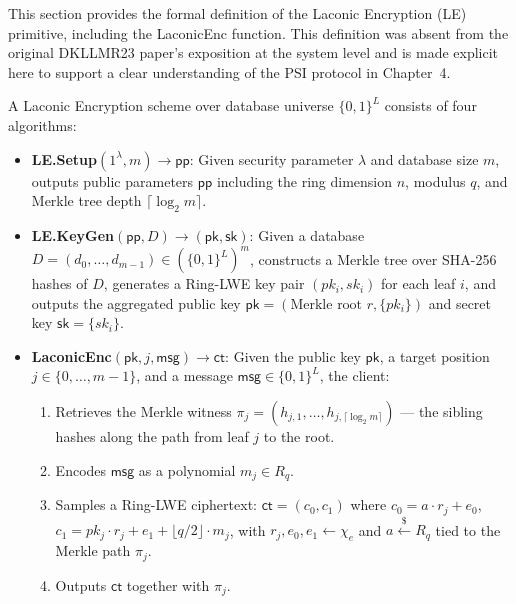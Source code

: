 This section provides the formal definition of the Laconic Encryption (LE) primitive,
including the \textsf{LaconicEnc} function. This definition was absent from the original
DKLLMR23 paper's exposition at the system level and is made explicit here to support
a clear understanding of the PSI protocol in Chapter~4.

\begin{definition}\label{def:laconic-enc}
A Laconic Encryption scheme over database universe $\{0,1\}^L$ consists of four algorithms:

\begin{itemize}
    \item \textsf{\textbf{LE.Setup}}$(1^\lambda, m) \to \mathsf{pp}$: Given security
          parameter $\lambda$ and database size $m$, outputs public parameters $\mathsf{pp}$
          including the ring dimension $n$, modulus $q$, and Merkle tree depth $\lceil \log_2 m \rceil$.
          
    \item \textsf{\textbf{LE.KeyGen}}$(\mathsf{pp}, D) \to (\mathsf{pk}, \mathsf{sk})$: Given a
          database $D = (d_0, \ldots, d_{m-1}) \in (\{0,1\}^L)^m$, constructs a Merkle tree
          over SHA-256 hashes of $D$, generates a Ring-LWE key pair $(pk_i, sk_i)$ for each
          leaf $i$, and outputs the aggregated public key $\mathsf{pk} = (\text{Merkle root } r, \{pk_i\})$
          and secret key $\mathsf{sk} = \{sk_i\}$.
          
    \item \textsf{\textbf{LaconicEnc}}$(\mathsf{pk}, j, \mathsf{msg}) \to \mathsf{ct}$: Given
          the public key $\mathsf{pk}$, a target position $j \in \{0, \ldots, m-1\}$, and a
          message $\mathsf{msg} \in \{0,1\}^L$, the client:
          \begin{enumerate}
              \item Retrieves the Merkle witness $\pi_j = (h_{j,1}, \dots, h_{j,\lceil \log_2 m \rceil})$ --- the sibling hashes along the path from leaf $j$ to the root.
              \item Encodes $\mathsf{msg}$ as a polynomial $m_j \in R_q$.
              \item Samples a Ring-LWE ciphertext: $\mathsf{ct} = (c_0, c_1)$ where
                    $c_0 = a \cdot r_j + e_0$, $c_1 = pk_j \cdot r_j + e_1 + \lfloor q/2 \rfloor \cdot m_j$,
                    with $r_j, e_0, e_1 \leftarrow \chi_e$ and $a \xleftarrow{\$} R_q$ tied to the
                    Merkle path $\pi_j$.
              \item Outputs $\mathsf{ct}$ together with $\pi_j$.
          \end{enumerate}
          

\end{itemize}
\end{definition}

